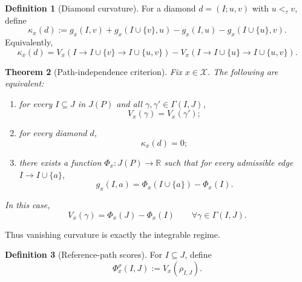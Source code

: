\documentclass{article}
\newtheorem{theorem}{Theorem}[section]
\theoremstyle{definition}
\newtheorem{definition}[theorem]{Definition}
\newcommand{\RR}{\mathbb R}
\begin{document}
\begin{definition}[Diamond curvature]
For a diamond \(d=(I;u,v)\) with \(u<_{\tau}v\), define
\begin{equation}
\kappa_x(d)
:=
g_x(I,v)+g_x(I\cup\{v\},u)-g_x(I,u)-g_x(I\cup\{u\},v).
\label{eq:diamond-curvature}
\end{equation}
Equivalently,
\[
\kappa_x(d)
=
V_x\!\left(I\to I\cup\{v\}\to I\cup\{u,v\}\right)
-
V_x\!\left(I\to I\cup\{u\}\to I\cup\{u,v\}\right).
\]
\end{definition}

\begin{theorem}[Path-independence criterion]
\label{thm:path-independence-main}
Fix \(x\in\mathcal X\). The following are equivalent:
\begin{enumerate}
    \item for every \(I\subseteq J\) in \(J(P)\) and all \(\gamma,\gamma'\in \Gamma(I,J)\),
    \begin{equation}
    V_x(\gamma)=V_x(\gamma');
    \label{eq:path-independence-condition}
    \end{equation}
    \item for every diamond \(d\),
    \begin{equation}
    \kappa_x(d)=0;
    \label{eq:zero-curvature-condition}
    \end{equation}
    \item there exists a function \(\Phi_x:J(P)\to\RR\) such that for every admissible edge \(I\to I\cup\{a\}\),
    \begin{equation}
    g_x(I,a)=\Phi_x(I\cup\{a\})-\Phi_x(I).
    \label{eq:endpoint-potential-gradient}
    \end{equation}
\end{enumerate}
In this case,
\begin{equation}
V_x(\gamma)=\Phi_x(J)-\Phi_x(I)
\qquad
\forall \gamma\in \Gamma(I,J).
\label{eq:path-independence-telescoping}
\end{equation}
\end{theorem}

Thus vanishing curvature is exactly the integrable regime.

\begin{definition}[Reference-path scores]
For \(I\subseteq J\), define
\begin{equation}
\Phi_x^\rho(I,J):=V_x(\rho_{I,J}).
\label{eq:reference-path-score}
\end{equation}
\end{definition}
\end{document}
